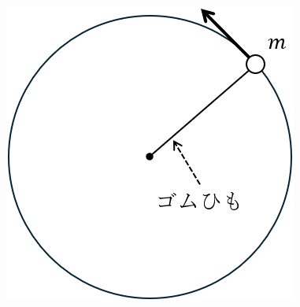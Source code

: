 \begin{figure}[H]
\begin{minipage}[b]{.25\columnwidth}
    \includegraphics[width=\columnwidth]{../graphs/toritsu_23_1-3.png}
    \caption{}
  \end{minipage}
\end{figure}

